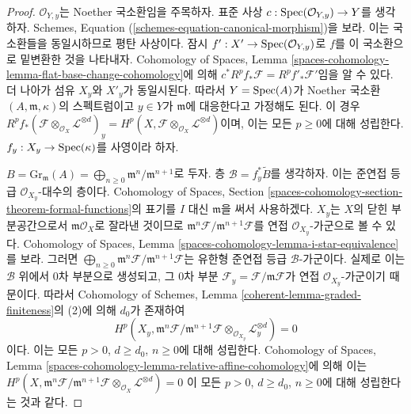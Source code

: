 \begin{proof}
$\mathcal{O}_{Y, y}$는 Noether 국소환임을 주목하자. 표준 사상
$c : \mathop{\mathrm{Spec}}(\mathcal{O}_{Y, y}) \to Y$를 생각하자. Schemes, Equation
(\ref{schemes-equation-canonical-morphism})을 보라. 이는 국소환들을
동일시하므로 평탄 사상이다. 잠시 $f' : X' \to
\mathop{\mathrm{Spec}}(\mathcal{O}_{Y, y})$로 $f$를 이 국소환으로 밑변환한 것을 나타내자.
Cohomology of Spaces, Lemma
\ref{spaces-cohomology-lemma-flat-base-change-cohomology}에 의해
$c^*R^pf_*\mathcal{F} = R^pf'_*\mathcal{F}'$임을 알 수 있다.
더 나아가 섬유 $X_y$와 $X'_y$가 동일시된다. 따라서 $Y = \mathop{\mathrm{Spec}}(A)$가
Noether 국소환 $(A, \mathfrak m, \kappa)$의 스펙트럼이고 $y \in Y$가
$\mathfrak m$에 대응한다고 가정해도 된다. 이 경우
$R^pf_*(\mathcal{F} \otimes_{\mathcal{O}_X} \mathcal{L}^{\otimes d})_y =
H^p(X, \mathcal{F} \otimes_{\mathcal{O}_X} \mathcal{L}^{\otimes d})$이며,
이는 모든 $p \geq 0$에 대해 성립한다.
$f_y : X_y \to \mathop{\mathrm{Spec}}(\kappa)$를 사영이라 하자.

\medskip\noindent
$B = \text{Gr}_\mathfrak m(A) =
\bigoplus_{n \geq 0} \mathfrak m^n/\mathfrak m^{n + 1}$로 두자.
층 $\mathcal{B} = f_y^*\widetilde{B}$를 생각하자. 이는 준연접 등급
$\mathcal{O}_{X_y}$-대수의 층이다. Cohomology of Spaces,
Section \ref{spaces-cohomology-section-theorem-formal-functions}의 표기를
$I$ 대신 $\mathfrak m$을 써서 사용하겠다.
$X_y$는 $X$의 닫힌 부분공간으로서 $\mathfrak m\mathcal{O}_X$로
잘라낸 것이므로
$\mathfrak m^n\mathcal{F}/\mathfrak m^{n + 1}\mathcal{F}$를 연접
$\mathcal{O}_{X_y}$-가군으로 볼 수 있다. Cohomology of Spaces, Lemma
\ref{spaces-cohomology-lemma-i-star-equivalence}를 보라. 그러면
$\bigoplus_{n \geq 0} \mathfrak m^n\mathcal{F}/\mathfrak m^{n + 1}\mathcal{F}$는
유한형 준연접 등급 $\mathcal{B}$-가군이다. 실제로 이는
$\mathcal{B}$ 위에서 0차 부분으로 생성되고,
그 0차 부분 $\mathcal{F}_y = \mathcal{F}/\mathfrak m \mathcal{F}$가
연접 $\mathcal{O}_{X_y}$-가군이기 때문이다. 따라서 Cohomology of
Schemes, Lemma \ref{coherent-lemma-graded-finiteness}의 (2)에 의해
$d_0$가 존재하여
$$
H^p(X_y, \mathfrak m^n \mathcal{F}/ \mathfrak m^{n + 1}\mathcal{F}
\otimes_{\mathcal{O}_{X_y}} \mathcal{L}_y^{\otimes d}) = 0
$$
이다. 이는 모든 $p > 0$, $d \geq d_0$, $n \geq 0$에 대해 성립한다.
Cohomology of Spaces, Lemma
\ref{spaces-cohomology-lemma-relative-affine-cohomology}에 의해 이는
$
H^p(X, \mathfrak m^n \mathcal{F}/ \mathfrak m^{n + 1}\mathcal{F}
\otimes_{\mathcal{O}_X} \mathcal{L}^{\otimes d}) = 0
$
이 모든 $p > 0$, $d \geq d_0$, $n \geq 0$에 대해 성립한다는 것과 같다.


\end{proof}
